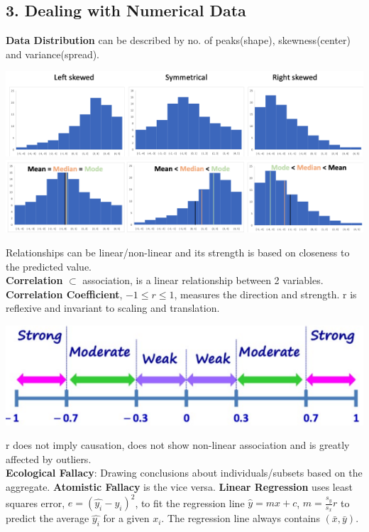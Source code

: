 \begin{multicols*}{3}
\subsection{3. Dealing with Numerical Data}
\textbf{Data Distribution} can be described by no. of peaks(shape), skewness(center) and variance(spread).
\begin{center}
    \includegraphics[width=1\linewidth]{cheatsheet/skewness.png}
    \includegraphics[width=1\linewidth]{cheatsheet/central_tendency.png}
\end{center}
Relationships can be linear/non-linear and its strength is based on closeness to the predicted value. \\
\textbf{Correlation} $\subset$ association, is a linear relationship between 2 variables. \textbf{Correlation Coefficient}, $-1\leq r \leq 1$, measures the direction and strength. r is reflexive and invariant to scaling and translation.\\
\begin{center}
    \includegraphics[width=0.7\linewidth]{cheatsheet/correlation_strength.png}
\end{center}
r does not imply causation, does not show non-linear association and is greatly affected by outliers.\\
\textbf{Ecological Fallacy}: Drawing conclusions about individuals/subsets based on the aggregate. \textbf{Atomistic Fallacy} is the vice versa.
\textbf{Linear Regression} uses least squares error, $e=(\hat{y_i}-y_i)^2$, to fit the regression line $\hat{y}=mx+c$, $m=\frac{s_y}{s_x}r$ to predict the average $\hat{y_i}$ for a given $x_i$. The regression line always contains $(\bar{x}, \bar{y})$.


\end{multicols*}

